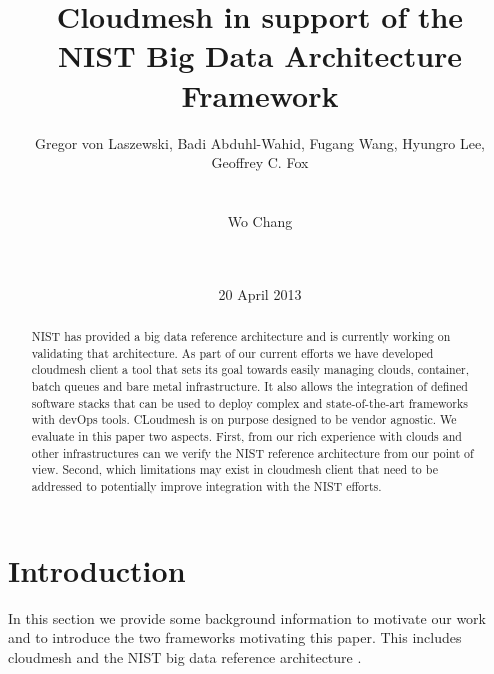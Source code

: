 

\title{Cloudmesh in support of the\\NIST Big Data Architecture Framework}


\author{
\alignauthor
Gregor von Laszewski, Badi Abduhl-Wahid, Fugang Wang, Hyungro Lee, Geoffrey C. Fox\\
       \\
       \\
\alignauthor
Wo Chang\\
       \\
       \\
}
\date{20 April 2013}

\maketitle

\begin{abstract}
NIST has provided a big data reference architecture and is currently
working on validating that architecture. As part of our current
efforts we have developed cloudmesh client a tool that sets its goal
towards easily managing clouds, container, batch queues and bare metal
infrastructure. It also allows the integration of defined software
stacks that can be used to deploy complex and state-of-the-art
frameworks with devOps tools. CLoudmesh is on purpose designed to be
vendor agnostic. We evaluate in this paper two aspects. First, from
our rich experience with clouds and other infrastructures can we
verify the NIST reference architecture from our point of view. Second,
which limitations may exist in cloudmesh client that need to be
addressed to potentially improve integration with the NIST efforts. 
\end{abstract}


\section{Introduction}

In this section we provide some background information to motivate our
work and to introduce the two frameworks motivating this paper. This
includes cloudmesh \cite{las12-cloud} \cite{github-cloudmesh-client}
and the NIST big data reference architecture \cite{nist-bd}.


